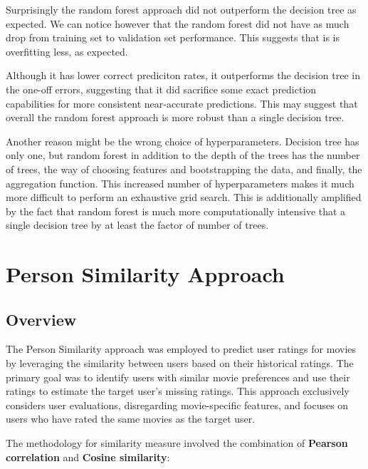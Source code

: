 \documentclass[a4paper,9pt]{article}
\begin{document}
Surprisingly the random forest approach did not outperform the decision tree as expected.
We can notice however that the random forest did not have as much drop from training set to validation set performance.
This suggests that is is overfitting less, as expected.

Although it has lower correct prediciton rates, it outperforms the decision tree in the one-off errors, suggesting that it did sacrifice some exact prediction capabilities for more consistent near-accurate predictions. This may suggest that overall the random forest approach is more robust than a single decision tree.

Another reason might be the wrong choice of hyperparameters. Decision tree has only one, but random forest in addition to the depth of the trees has the number of trees, the way of choosing features and bootstrapping the data, and finally, the aggregation function. This increased number of hyperparameters makes it much more difficult to perform an exhaustive grid search. This is additionally amplified by the fact that random forest is much more computationally intensive that a single decision tree by at least the factor of number of trees.

\clearpage
\section{Person Similarity Approach}
\subsection{Overview}
The Person Similarity approach was employed to predict user ratings for movies by leveraging the similarity
between users based on their historical ratings.
The primary goal was to identify users with similar movie preferences and use their ratings to estimate
the target user's missing ratings.
This approach exclusively considers user evaluations, disregarding movie-specific features, and focuses
on users who have rated the same movies as the target user.

The methodology for similarity measure involved the combination of \textbf{Pearson correlation} and \textbf{Cosine similarity}:
\end{document}
